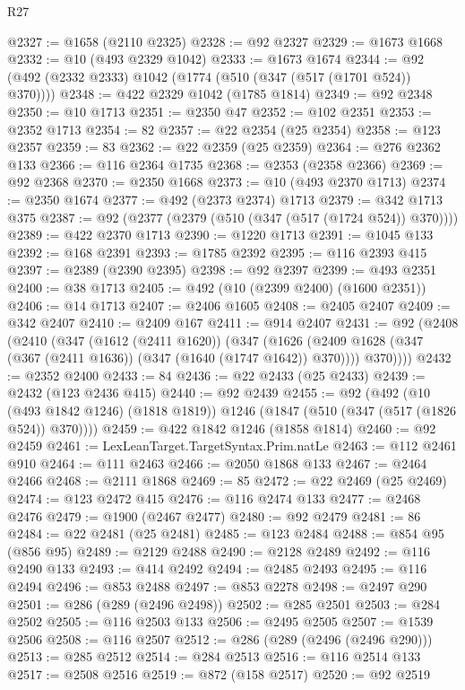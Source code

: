 \begin{lexlean}{R27}
\begin{coremodule}
@2327 := @1658 (@2110 @2325)
@2328 := @92 @2327
@2329 := @1673 @1668
@2332 := @10 (@493 @2329 @1042)
@2333 := @1673 @1674
@2344 := @92 (@492 (@2332 @2333) @1042 (@1774 (@510 (@347 (@517 (@1701 @524)) @370))))
@2348 := @422 @2329 @1042 (@1785 @1814)
@2349 := @92 @2348
@2350 := @10 @1713
@2351 := @2350 @47
@2352 := @102 @2351
@2353 := @2352 @1713
@2354 := 82
@2357 := @22 @2354 (@25 @2354)
@2358 := @123 @2357
@2359 := 83
@2362 := @22 @2359 (@25 @2359)
@2364 := @276 @2362 @133
@2366 := @116 @2364 @1735
@2368 := @2353 (@2358 @2366)
@2369 := @92 @2368
@2370 := @2350 @1668
@2373 := @10 (@493 @2370 @1713)
@2374 := @2350 @1674
@2377 := @492 (@2373 @2374) @1713
@2379 := @342 @1713 @375
@2387 := @92 (@2377 (@2379 (@510 (@347 (@517 (@1724 @524)) @370))))
@2389 := @422 @2370 @1713
@2390 := @1220 @1713
@2391 := @1045 @133
@2392 := @168 @2391
@2393 := @1785 @2392
@2395 := @116 @2393 @415
@2397 := @2389 (@2390 @2395)
@2398 := @92 @2397
@2399 := @493 @2351
@2400 := @38 @1713
@2405 := @492 (@10 (@2399 @2400) (@1600 @2351))
@2406 := @14 @1713
@2407 := @2406 @1605
@2408 := @2405 @2407
@2409 := @342 @2407
@2410 := @2409 @167
@2411 := @914 @2407
@2431 := @92
    (@2408
      (@2410
        (@347
          (@1612 (@2411 @1620))
          (@347
            (@1626 (@2409 @1628 (@347 (@367 (@2411 @1636)) (@347 (@1640 (@1747 @1642)) @370))))
            @370))))
@2432 := @2352 @2400
@2433 := 84
@2436 := @22 @2433 (@25 @2433)
@2439 := @2432 (@123 @2436 @415)
@2440 := @92 @2439
@2455 := @92
    (@492
      (@10 (@493 @1842 @1246) (@1818 @1819))
      @1246
      (@1847 (@510 (@347 (@517 (@1826 @524)) @370))))
@2459 := @422 @1842 @1246 (@1858 @1814)
@2460 := @92 @2459
@2461 := LexLeanTarget.TargetSyntax.Prim.natLe
@2463 := @112 @2461 @910
@2464 := @111 @2463
@2466 := @2050 @1868 @133
@2467 := @2464 @2466
@2468 := @2111 @1868
@2469 := 85
@2472 := @22 @2469 (@25 @2469)
@2474 := @123 @2472 @415
@2476 := @116 @2474 @133
@2477 := @2468 @2476
@2479 := @1900 (@2467 @2477)
@2480 := @92 @2479
@2481 := 86
@2484 := @22 @2481 (@25 @2481)
@2485 := @123 @2484
@2488 := @854 @95 (@856 @95)
@2489 := @2129 @2488
@2490 := @2128 @2489
@2492 := @116 @2490 @133
@2493 := @414 @2492
@2494 := @2485 @2493
@2495 := @116 @2494
@2496 := @853 @2488
@2497 := @853 @2278
@2498 := @2497 @290
@2501 := @286 (@289 (@2496 @2498))
@2502 := @285 @2501
@2503 := @284 @2502
@2505 := @116 @2503 @133
@2506 := @2495 @2505
@2507 := @1539 @2506
@2508 := @116 @2507
@2512 := @286 (@289 (@2496 (@2496 @290)))
@2513 := @285 @2512
@2514 := @284 @2513
@2516 := @116 @2514 @133
@2517 := @2508 @2516
@2519 := @872 (@158 @2517)
@2520 := @92 @2519

\end{coremodule}
\end{lexlean}

